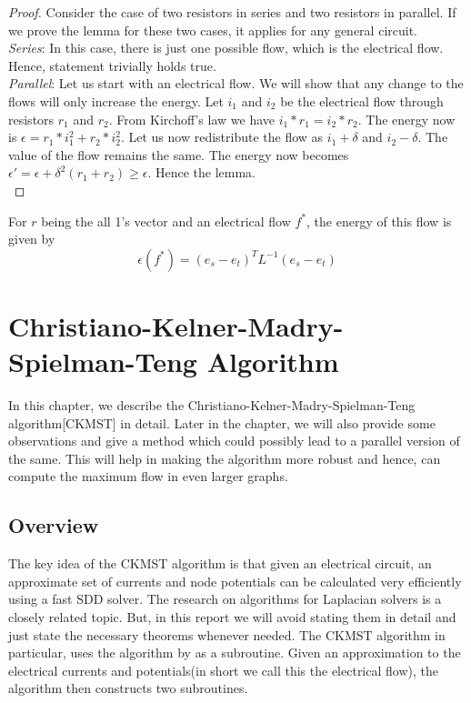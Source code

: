 \documentclass[BTech]{iitmdiss}
\begin{document}
		  \begin{proof}
		    Consider the case of two resistors in series and two resistors in parallel. If we prove the lemma for these two cases, it applies for 
		    any general circuit. \\
		    
		    \textit{Series}: In this case, there is just one possible flow, which is the electrical flow. Hence, statement trivially holds true. \\
		    
		    \textit{Parallel}:  Let us start with an electrical flow. We will show that any change to the flows will only increase the energy.
		    Let $i_1$ and $i_2$ be the electrical flow through resistors $r_1$ and $r_2$. From Kirchoff's law we have $i_1 \ast r_1 = i_2 \ast r_2 $.
		    The energy now is $\epsilon = r_1  \ast i_1^2 + r_2 \ast i_2^2$. Let us now redistribute the flow as $i_1 + \delta$ and $i_2 - \delta$. 
		    The value of the flow remains the same. The energy now becomes $\epsilon' = \epsilon + \delta^2(r_1+r_2) \geq \epsilon$. Hence the lemma. \\
 		  \end{proof}
 		  
		   \begin{prop} For $r$ being the all 1's vector and an electrical flow $f^{\ast}$, the energy of this flow is given by
		      $$\epsilon(f^{\ast}) = (e_s - e_t)^T L^{-1} (e_s-e_t)$$
		    
		   \end{prop}
 
	 \chapter{Christiano-Kelner-Madry-Spielman-Teng Algorithm}
	 
	    In this chapter, we describe the Christiano-Kelner-Madry-Spielman-Teng algorithm[CKMST] in detail. Later in the chapter,
	 we will also provide some observations and give a method which could possibly lead to a parallel version of the same. This will help in 
	 making the algorithm more robust and hence, can compute the maximum flow in even larger graphs.\\
	 
	 \section{Overview}
	    The key idea of the CKMST algorithm is that given an electrical circuit, an approximate set of currents and node potentials can be calculated
	 very efficiently using a fast SDD solver. The research on algorithms for Laplacian solvers is a closely related topic. But, 
	 in this report we will avoid stating them in detail and just state the necessary theorems whenever needed. The CKMST algorithm in
	 particular, uses the algorithm by \cite{DBLP:journals/corr/abs-1003-2958} as a subroutine. Given an approximation to the 
	 electrical currents and potentials(in short we call this the electrical flow), the algorithm then constructs two subroutines. 
	 
\end{document}
